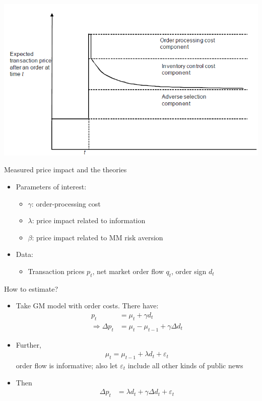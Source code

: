 \documentclass[english,10pt
,aspectratio=169
]{beamer}
\begin{document}
\begin{frame}{}
	\includegraphics[width=0.8\linewidth]{pics/PriceDiscovery_Image}
\end{frame}


\begin{frame}{Measured price impact and the theories}
	\begin{itemize}
		\item Parameters of interest:
		\begin{itemize}
			\item $\gamma$: order-processing cost
			\item $\lambda$: price impact related to information
			\item $\beta$: price impact related to MM risk aversion
		\end{itemize}
		\item Data:
		\begin{itemize}
			\item Transaction prices $p_t$, net market order flow $q_t$, order sign $d_t$
		\end{itemize}
	\end{itemize}
\end{frame}


\begin{frame}{How to estimate?}
	\begin{itemize}
		\item Take GM model with order costs. There have:
		\begin{align*}
			p_t &= \mu_t + \gamma d_t
			\\
			\Rightarrow \varDelta p_t &= \mu_t - \mu_{t-1} + \gamma \varDelta d_t
		\end{align*}
		\item Further,
		\begin{align*}
			\mu_t = \mu_{t-1} + \lambda d_t + \varepsilon_t
		\end{align*}
		order flow is informative; also let $\varepsilon_t$ include all other kinds of public news
		\item Then
		\begin{align*}
			\varDelta p_t &= \lambda d_t + \gamma \varDelta d_t + \varepsilon_t
		\end{align*}
	\end{itemize}
\end{frame}
\end{document}
